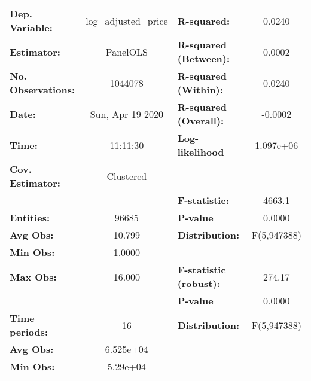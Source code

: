 \documentclass{report}
\begin{document}
\begin{center}
\begin{tabular}{lclc}
\toprule
\textbf{Dep. Variable:}                          & log\_adjusted\_price & \textbf{  R-squared:         }   &      0.0240      \\
\textbf{Estimator:}                              &       PanelOLS       & \textbf{  R-squared (Between):}  &      0.0002      \\
\textbf{No. Observations:}                       &       1044078        & \textbf{  R-squared (Within):}   &      0.0240      \\
\textbf{Date:}                                   &   Sun, Apr 19 2020   & \textbf{  R-squared (Overall):}  &     -0.0002      \\
\textbf{Time:}                                   &       11:11:30       & \textbf{  Log-likelihood     }   &    1.097e+06     \\
\textbf{Cov. Estimator:}                         &      Clustered       & \textbf{                     }   &                  \\
\textbf{}                                        &                      & \textbf{  F-statistic:       }   &      4663.1      \\
\textbf{Entities:}                               &        96685         & \textbf{  P-value            }   &      0.0000      \\
\textbf{Avg Obs:}                                &        10.799        & \textbf{  Distribution:      }   &   F(5,947388)    \\
\textbf{Min Obs:}                                &        1.0000        & \textbf{                     }   &                  \\
\textbf{Max Obs:}                                &        16.000        & \textbf{  F-statistic (robust):} &      274.17      \\
\textbf{}                                        &                      & \textbf{  P-value            }   &      0.0000      \\
\textbf{Time periods:}                           &          16          & \textbf{  Distribution:      }   &   F(5,947388)    \\
\textbf{Avg Obs:}                                &      6.525e+04       & \textbf{                     }   &                  \\
\textbf{Min Obs:}                                &       5.29e+04       & \textbf{                     }   &                  \\

\end{tabular}
\end{center}
\end{document}
